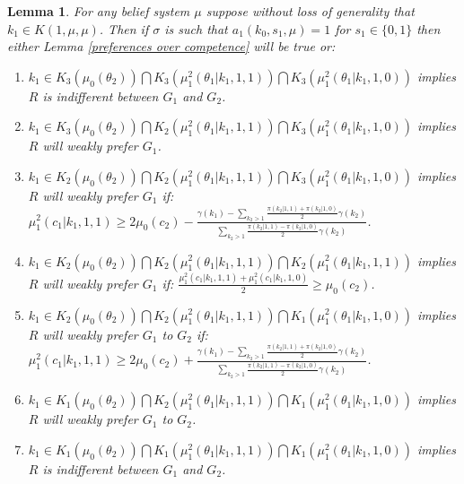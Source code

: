 \documentclass[11pt,]{article}
\newtheorem{lemma}[]{Lemma}
\begin{document}
\begin{lemma}  For any belief system $\mu$ suppose without loss of generality that $k_1\in K(1,\mu,\mu)$.  Then if $\sigma$ is such that $a_1(k_0,s_1,\mu)=1$ for $s_1\in\{0,1\}$ then either Lemma \ref{preferences over competence} will be true or:
\begin{enumerate}
\item $k_1\in K_3(\mu_0(\theta_2))\bigcap K_3(\mu_1^2(\theta_1|k_1,1,1))\bigcap K_3(\mu_1^2(\theta_1|k_1,1,0))$ implies $R$ is indifferent between $G_1$ and $G_2$.
\item $k_1\in K_3(\mu_0(\theta_2))\bigcap K_2(\mu_1^2(\theta_1|k_1,1,1))\bigcap K_3(\mu_1^2(\theta_1|k_1,1,0))$ implies $R$ will weakly prefer $G_1$.
\item $k_1\in K_2(\mu_0(\theta_2))\bigcap K_2(\mu_1^2(\theta_1|k_1,1,1))\bigcap K_3(\mu_1^2(\theta_1|k_1,1,0))$ implies $R$ will weakly prefer $G_1$ if: $\mu_1^2(c_1|k_1,1,1)\geq2\mu_0(c_2)-\frac{\gamma(k_1)-\sum_{k_2>1}\frac{\pi(k_2|1,1)+\pi(k_2|1,0)}{2}\gamma(k_2)}{\sum_{k_2>1}\frac{\pi(k_2|1,1)-\pi(k_2|1,0)}{2}\gamma(k_2)}$.
\item $k_1\in K_2(\mu_0(\theta_2))\bigcap K_2(\mu_1^2(\theta_1|k_1,1,1))\bigcap K_2(\mu_1^2(\theta_1|k_1,1,1))$ implies $R$ will weakly prefer $G_1$ if: $\frac{\mu^2_1(c_1|k_1,1,1)+\mu^2_1(c_1|k_1,1,0)}{2}\geq\mu_0(c_2)$.
\item $k_1\in K_2(\mu_0(\theta_2))\bigcap K_2(\mu_1^2(\theta_1|k_1,1,1))\bigcap K_1(\mu_1^2(\theta_1|k_1,1,0))$ implies $R$ will weakly prefer $G_1$ to $G_2$ if: $\mu_1^2(c_1|k_1,1,1)\geq2\mu_0(c_2)+\frac{\gamma(k_1)-\sum_{k_2>1}\frac{\pi(k_2|1,1)+\pi(k_2|1,0)}{2}\gamma(k_2)}{\sum_{k_2>1}\frac{\pi(k_2|1,1)-\pi(k_2|1,0)}{2}\gamma(k_2)}$.
\item $k_1\in K_1(\mu_0(\theta_2))\bigcap K_2(\mu_1^2(\theta_1|k_1,1,1))\bigcap K_1(\mu_1^2(\theta_1|k_1,1,0))$ implies $R$ will weakly prefer $G_1$ to $G_2$.
\item $k_1\in K_1(\mu_0(\theta_2))\bigcap K_1(\mu_1^2(\theta_1|k_1,1,1))\bigcap K_1(\mu_1^2(\theta_1|k_1,1,0))$ implies $R$ is indifferent between $G_1$ and $G_2$.
\end{enumerate}\label{ruler decision}
\end{lemma}
\end{document}

